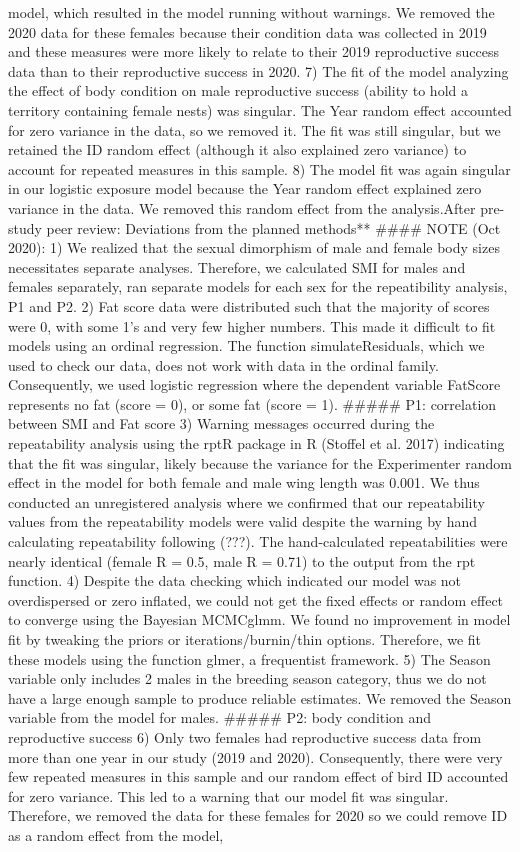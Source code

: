 \documentclass[
]{article}
\begin{document}
{{{model, which resulted in the model running without warnings. We removed
the 2020 data for these females because their condition data was
collected in 2019 and these measures were more likely to relate to their
2019 reproductive success data than to their reproductive success in
2020. 7) The fit of the model analyzing the effect of body condition on
male reproductive success (ability to hold a territory containing female
nests) was singular. The Year random effect accounted for zero variance
in the data, so we removed it. The fit was still singular, but we
retained the ID random effect (although it also explained zero variance)
to account for repeated measures in this sample. 8) The model fit was
again singular in our logistic exposure model because the Year random
effect explained zero variance in the data. We removed this random
effect from the
analysis.}{After pre-study peer review: Deviations from the planned methods** \#\#\#\# NOTE (Oct 2020): 1) We realized that the sexual dimorphism of male and female body sizes necessitates separate analyses. Therefore, we calculated SMI for males and females separately, ran separate models for each sex for the repeatibility analysis, P1 and P2. 2) Fat score data were distributed such that the majority of scores were 0, with some 1's and very few higher numbers. This made it difficult to fit models using an ordinal regression. The function simulateResiduals, which we used to check our data, does not work with data in the ordinal family. Consequently, we used logistic regression where the dependent variable FatScore represents no fat (score = 0), or some fat (score = 1). \#\#\#\#\# P1: correlation between SMI and Fat score 3) Warning messages occurred during the repeatability analysis using the rptR package in R (Stoffel et al. 2017) indicating that the fit was singular, likely because the variance for the Experimenter random effect in the model for both female and male wing length was 0.001. We thus conducted an unregistered analysis where we confirmed that our repeatability values from the repeatability models were valid despite the warning by hand calculating repeatability following (???). The hand-calculated repeatabilities were nearly identical (female R = 0.5, male R = 0.71) to the output from the rpt function. 4) Despite the data checking which indicated our model was not overdispersed or zero inflated, we could not get the fixed effects or random effect to converge using the Bayesian MCMCglmm. We found no improvement in model fit by tweaking the priors or iterations/burnin/thin options. Therefore, we fit these models using the function glmer, a frequentist framework. 5) The Season variable only includes 2 males in the breeding season category, thus we do not have a large enough sample to produce reliable estimates. We removed the Season variable from the model for males. \#\#\#\#\# P2: body condition and reproductive success 6) Only two females had reproductive success data from more than one year in our study (2019 and 2020). Consequently, there were very few repeated measures in this sample and our random effect of bird ID accounted for zero variance. This led to a warning that our model fit was singular. Therefore, we removed the data for these females for 2020 so we could remove ID as a random effect from the model, }}}
\end{document}
